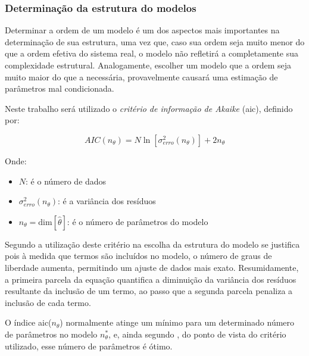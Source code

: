 \subsubsection{Determinação da estrutura do modelos}
\label{subsubsec:determinacao_da_estrutura_do_modelo}

Determinar a ordem de um modelo é um dos aspectos mais importantes na determinação de sua estrutura,
uma vez que, caso sua ordem seja muito menor do que a ordem efetiva do sistema real, o modelo não
refletirá a completamente sua complexidade estrutural. Analogamente, escolher um modelo que a ordem
seja muito maior do que a necessária, provavelmente causará uma estimação de parâmetros mal condicionada.
\cite{Aguirre2015}

Neste trabalho será utilizado o \textit{critério de informação de Akaike} 
(\acrshort{aic}), definido por:

\begin{equation}
	\label{eq:aic}
	AIC(n_\theta) = N \ln \left[ \sigma_{erro}^2 (n_\theta) \right] + 2n_\theta
\end{equation}

\noindent
Onde: 
\begin{itemize}
	\item $N$: é o número de dados
	\item $\sigma_{erro}^2 (n_\theta)$: é a variância dos resíduos
	\item $n_\theta = \mathrm{dim}[\hat{\theta}]$: é o número de parâmetros do modelo
\end{itemize}

Segundo  a utilização deste critério na escolha da estrutura do modelo se justifica
pois à medida que termos são incluídos no modelo, o número de graus de liberdade aumenta, permitindo
um ajuste de dados mais exato. Resumidamente, a primeira parcela da equação quantifica a diminuição
da variância dos resíduos resultante da inclusão de um termo, ao passo que a segunda parcela penaliza
a inclusão de cada termo.

O índice \acrshort{aic}($n_\theta$) normalmente atinge um mínimo para um determinado número de parâmetros
no modelo $n_{\theta}^*$, e, ainda segundo , do ponto de vista do critério utilizado,
esse número de parâmetros é ótimo.

